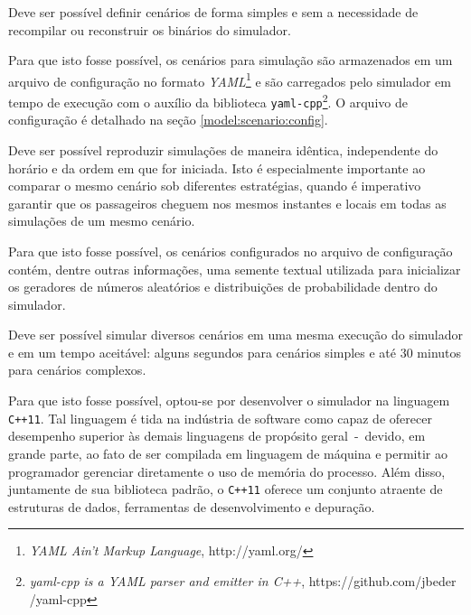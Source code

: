 \begin{description}[leftmargin=!,labelwidth=\widthof{\bfseries Determinístico}]

  \item[Configurável]

  Deve ser possível definir cenários de forma simples e sem a necessidade de
  recompilar ou reconstruir os binários do simulador.

  Para que isto fosse possível, os cenários para simulação são armazenados em um
  arquivo de configuração no formato \textit{YAML}\footnote{\textit{YAML Ain't
  Markup Language}, http://yaml.org/} e são carregados pelo simulador em tempo
  de execução com o auxílio da biblioteca \texttt{yaml-cpp}\footnote{\textit
  {yaml-cpp is a YAML parser and emitter in C++}, https://github.com/jbeder
  /yaml-cpp}. O arquivo de configuração é detalhado na seção
  \ref{model:scenario:config}.

  \item[Determinístico]

  Deve ser possível reproduzir simulações de maneira idêntica, independente do
  horário e da ordem em que for iniciada. Isto é especialmente importante ao
  comparar o mesmo cenário sob diferentes estratégias, quando é imperativo
  garantir que os passageiros cheguem nos mesmos instantes e locais em todas as
  simulações de um mesmo cenário.

  Para que isto fosse possível, os cenários configurados no arquivo de
  configuração contém, dentre outras informações, uma semente textual utilizada
  para inicializar os geradores de números aleatórios e distribuições de
  probabilidade dentro do simulador.

  \item[Escalável]

  Deve ser possível simular diversos cenários em uma mesma execução do simulador
  e em um tempo aceitável: alguns segundos para cenários simples e até 30
  minutos para cenários complexos.

  Para que isto fosse possível, optou-se por desenvolver o simulador na
  linguagem \texttt{C++11}. Tal linguagem é tida na indústria de software como
  capaz de oferecer desempenho superior às demais linguagens de propósito
  geral~-~devido, em grande parte, ao fato de ser compilada em linguagem de
  máquina e permitir ao programador gerenciar diretamente o uso de memória do
  processo. Além disso, juntamente de sua biblioteca padrão, o \texttt{C++11}
  oferece um conjunto atraente de estruturas de dados, ferramentas de
  desenvolvimento e depuração.


\end{description}
